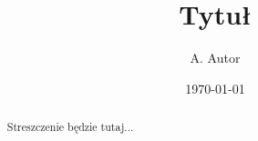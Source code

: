 \documentclass{article}
\title{Tytuł}
\author{A. Autor}
\date{\today}
\begin{document}
\maketitle

\begin{abstract}
Streszczenie będzie tutaj...
\end{abstract}
\end{document}
